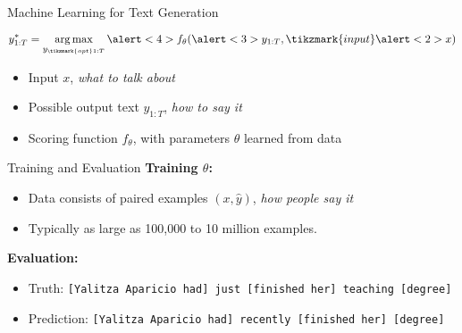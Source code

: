 \begin{frame}{Machine Learning for Text Generation}

  \[ y^*_{1:T} = \argmax_{y_{\tikzmark{opt}1:T}} \alert<4>{f}_{\theta}(\alert<3>{y_{1:T}}, \tikzmark{input}\alert<2>{x}) \]



  \begin{itemize}
    \pause
  \item Input \alert<2>{$x$},  \textit{what to talk about}
    \air
    \pause
  \item Possible output text \alert<3>{$y_{1:T}$}, \textit{how to say it}
    \air
    \pause
  \item Scoring function \alert<4>{$f_{\theta}$}, with parameters $\theta$ learned from data
  \end{itemize}

\end{frame}

\begin{frame}{Training and Evaluation}
  \textbf{Training $\theta$:}
  \begin{itemize}
  \item Data consists of paired examples $(x, \hat{y})$, \textit{how people say it}
  \item Typically as large as 100,000 to 10 million examples.
  \end{itemize}



    \pause

    \air

  \textbf{Evaluation:}

  \begin{itemize}
  \item Truth: \texttt{[Yalitza Aparicio had] just
      [finished her] teaching [degree]}

    \air
  \item Prediction: \texttt{[Yalitza Aparicio had] recently [finished
      her] [degree]}
  \end{itemize}
\end{frame}

